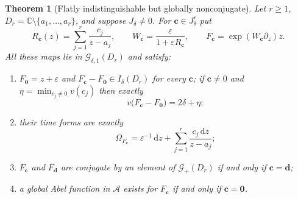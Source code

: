 \documentclass[11pt,letterpaper]{article}
\newtheorem{theorem}{Theorem}[section]
\theoremstyle{definition}
\theoremstyle{remark}
\newcommand{\C}{\mathbb C}
\newcommand{\GG}{\mathscr G}
\newcommand{\AAA}{\mathscr A}
\newcommand{\eps}{\varepsilon}
\newcommand{\dd}{\,\mathrm d}
\numberwithin{equation}{section}
\begin{document}
\begin{theorem}[Flatly indistinguishable but globally nonconjugate]
\label{dyn:thm:flat}
Let $r\ge1$, $D_r=\C\setminus\{a_1,\dots,a_r\}$, and suppose
$J_\delta\ne0$. For $\mathbf c\in J_\delta^{r}$ put
\begin{equation}\label{dyn:eq:flat-family}
 R_{\mathbf c}(z)=\sum_{j=1}^{r}\frac{c_j}{z-a_j},\qquad
 W_{\mathbf c}=\frac{\eps}{1+\eps R_{\mathbf c}},\qquad
 F_{\mathbf c}=\exp(W_{\mathbf c}\partial_z)z .
\end{equation}
All these maps lie in $\GG_{\delta,1}(D_r)$ and satisfy:
\begin{enumerate}[label=(\alph*)]
\item $F_{\mathbf0}=z+\eps$ and
$F_{\mathbf c}-F_{\mathbf0}\in I_\delta(D_r)$ for every $\mathbf c$; if
$\mathbf c\ne0$ and $\eta=\min_{c_j\ne0}v(c_j)$ then \emph{exactly}
\begin{equation}\label{dyn:eq:flat-valuation}
 v\bigl(F_{\mathbf c}-F_{\mathbf0}\bigr)=2\delta+\eta ;
\end{equation}
\item their time forms are \emph{exactly}
\begin{equation}\label{dyn:eq:exact-flat-form}
 \Omega_{F_{\mathbf c}}=\eps^{-1}\dd z+\sum_{j=1}^{r}\frac{c_j\dd z}{z-a_j};
\end{equation}
\item $F_{\mathbf c}$ and $F_{\mathbf d}$ are conjugate by an element of
$\GG_+(D_r)$ if and only if $\mathbf c=\mathbf d$;
\item a global Abel function in $\AAA$ exists for $F_{\mathbf c}$ if and
only if $\mathbf c=\mathbf0$.
\end{enumerate}
\end{theorem}
\end{document}
